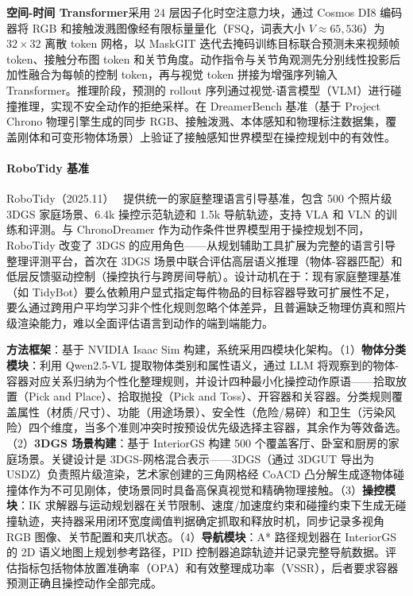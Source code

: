 \textbf{空间-时间 Transformer}采用 24 层因子化时空注意力块，通过 Cosmos DI8 编码器将 RGB 和接触泼溅图像经有限标量量化（FSQ，词表大小 $V \approx 65{,}536$）为 $32 \times 32$ 离散 token 网格，以 MaskGIT 迭代去掩码训练目标联合预测未来视频帧 token、接触分布图 token 和关节角度。动作指令与关节角观测先分别线性投影后加性融合为每帧的控制 token，再与视觉 token 拼接为增强序列输入 Transformer。推理阶段，预测的 rollout 序列通过视觉-语言模型（VLM）进行碰撞推理，实现不安全动作的拒绝采样。在 DreamerBench 基准（基于 Project Chrono 物理引擎生成的同步 RGB、接触泼溅、本体感知和物理标注数据集，覆盖刚体和可变形物体场景）上验证了接触感知世界模型在操控规划中的有效性。

\paragraph{RoboTidy 基准}

RoboTidy（2025.11）~\cite{2511_14161} 提供统一的家庭整理语言引导基准，包含 500 个照片级 3DGS 家庭场景、6.4k 操控示范轨迹和 1.5k 导航轨迹，支持 VLA 和 VLN 的训练和评测。与 ChronoDreamer 作为动作条件世界模型用于操控规划不同，RoboTidy 改变了 3DGS 的应用角色——从规划辅助工具扩展为完整的语言引导整理评测平台，首次在 3DGS 场景中联合评估高层语义推理（物体-容器匹配）和低层反馈驱动控制（操控执行与跨房间导航）。设计动机在于：现有家庭整理基准（如 TidyBot）要么依赖用户显式指定每件物品的目标容器导致可扩展性不足，要么通过跨用户平均学习非个性化规则忽略个体差异，且普遍缺乏物理仿真和照片级渲染能力，难以全面评估语言到动作的端到端能力。

\textbf{方法框架}：基于 NVIDIA Isaac Sim 构建，系统采用四模块化架构。（1）\textbf{物体分类模块}：利用 Qwen2.5-VL 提取物体类别和属性语义，通过 LLM 将观察到的物体-容器对应关系归纳为个性化整理规则，并设计四种最小化操控动作原语——拾取放置（Pick and Place）、拾取抛投（Pick and Toss）、开容器和关容器。分类规则覆盖属性（材质/尺寸）、功能（用途场景）、安全性（危险/易碎）和卫生（污染风险）四个维度，当多个准则冲突时按预设优先级选择主容器，其余作为等效备选。（2）\textbf{3DGS 场景构建}：基于 InteriorGS 构建 500 个覆盖客厅、卧室和厨房的家庭场景。关键设计是 3DGS-网格混合表示——3DGS（通过 3DGUT 导出为 USDZ）负责照片级渲染，艺术家创建的三角网格经 CoACD 凸分解生成逐物体碰撞体作为不可见刚体，使场景同时具备高保真视觉和精确物理接触。（3）\textbf{操控模块}：IK 求解器与运动规划器在关节限制、速度/加速度约束和碰撞约束下生成无碰撞轨迹，夹持器采用闭环宽度阈值判据确定抓取和释放时机，同步记录多视角 RGB 图像、关节配置和夹爪状态。（4）\textbf{导航模块}：A* 路径规划器在 InteriorGS 的 2D 语义地图上规划参考路径，PID 控制器追踪轨迹并记录完整导航数据。评估指标包括物体放置准确率（OPA）和有效整理成功率（VSSR），后者要求容器预测正确且操控动作全部完成。


